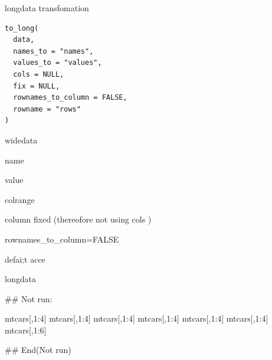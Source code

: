 \documentclass[a4paper]{book}
\begin{document}
%
\begin{Description}
longdata transfomation
\end{Description}
%
\begin{Usage}
\begin{verbatim}
to_long(
  data,
  names_to = "names",
  values_to = "values",
  cols = NULL,
  fix = NULL,
  rownames_to_column = FALSE,
  rowname = "rows"
)
\end{verbatim}
\end{Usage}
%
\begin{Arguments}
\begin{ldescription}
\item[\code{data}] widedata

\item[\code{names\_to}] name

\item[\code{values\_to}] value

\item[\code{cols}] colrange

\item[\code{fix}] column fixed (thereofore not using cols )

\item[\code{rownames\_to\_column}] rownames\_to\_column=FALSE

\item[\code{rowname}] defai;t acce
\end{ldescription}
\end{Arguments}
%
\begin{Value}
longdata
\end{Value}
%
\begin{Examples}
\begin{ExampleCode}
\#\# Not run: 

mtcars[,1:4] %
mtcars[,1:4] %
mtcars[,1:4] %
mtcars[,1:4] %
mtcars[,1:4] %
mtcars[,1:4] %
mtcars[,1:6] %







## End(Not run)
\end{ExampleCode}
\end{Examples}
\end{document}
